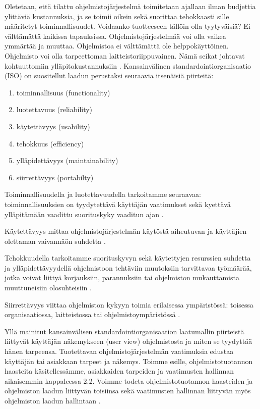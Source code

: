 \documentclass[finnish]{tktltiki2}
\theoremstyle{definition}
\theoremstyle{remark}
\begin{document}
Oletetaan, että tilattu ohjelmistojärjestelmä toimitetaan ajallaan ilman budjettia ylittäviä kustannuksia, ja se toimii oikein sekä suorittaa tehokkaasti sille määritetyt toiminnallisuudet. Voidaanko tuotteeseen tällöin olla tyytyväisiä? Ei välttämättä kaikissa tapauksissa. Ohjelmistojärjestelmää voi olla vaikea ymmärtää ja muuttaa. Ohjelmistoa ei välttämättä ole helppokäyttöinen. Ohjelmisto voi olla tarpeettoman laitteistoriippuvainen. Nämä seikat johtavat kohtuuttomiin ylläpitokustannuksiin \cite{BBL76}.
Kansainvälinen standardointiorganisaatio (ISO) on suositellut laadun perustaksi seuraavia itsenäisiä piirteitä: \cite{KIP96}

\begin{enumerate}
\item toiminnallisuus (functionality)
\item luotettavuus (reliability)
\item käytettävyys (usability)
\item tehokkuus (efficiency)
\item ylläpidettävyys (maintainability)
\item siirrettävyys (portabilty)
\end{enumerate}

Toiminnallisuudella ja luotettavuudella tarkoitamme seuraavaa: toiminnallisuuksien on tyydytettävä käyttäjän vaatimukset sekä kyettävä ylläpitämään vaadittu suorituskyky vaaditun ajan \cite{KIP96}.

Käytettävyys mittaa ohjelmistojärjestelmän käytöstä aiheutuvan ja käyttäjien olettaman vaivannäön suhdetta \cite{KIP96}. 

Tehokkuudella tarkoitamme suorituskyvyn sekä käytettyjen resurssien suhdetta ja yllä\-pidettävyydellä ohjelmistoon tehtäviin muutoksiin tarvittavaa työmäärää, jotka voivat liittyä korjauksiin, parannuksiin tai ohjelmiston mukauttamista muuttuneisiin olosuhteisiin \cite{KIP96}. 

Siirrettävyys viittaa ohjelmiston kykyyn toimia erilaisessa ympäristössä: toisessa organisaatiossa, laitteistossa tai ohjelmistoympäristössä \cite{KIP96}.

Yllä mainitut kansainvälisen standardointiorganisaation laatumallin piirteistä liittyvät käyttäjän näkemykseen (user view) ohjelmistosta ja miten se tyydyttää hänen tarpeensa. Tuotettavan ohjelmistojärjestelmän vaatimuksia edustaa käyttäjän tai asiakkaan tarpeet ja näkemys. Toimme esille, ohjelmistotuotannon haasteita käsitellessämme, asiakkaiden tarpeiden ja vaatimusten hallinnan aikaisemmin kappaleessa 2.2. Voimme todeta ohjelmistotuotannon haasteiden ja ohjelmiston laadun liittyvän toisiinsa sekä vaatimusten hallinnan liittyvän myös ohjelmiston laadun hallintaan \cite{KIP96}.
\end{document}
